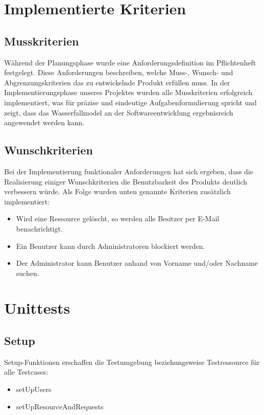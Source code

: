 \documentclass[parskip=full,11pt]{scrartcl}
\begin{document}
\newpage
\section{Implementierte Kriterien}
\subsection{Musskriterien}
Während der Planungsphase wurde eine Anforderungsdefinition im Pflichtenheft festgelegt. Diese Anforderungen beschreiben, welche Muss-, Wunsch- und Abgrenzungskriterien das zu entwickelnde Produkt erfüllen muss. In der Implementierungsphase unseres Projektes wurden alle Musskriterien erfolgreich implementiert, was für präzise und eindeutige Aufgabenformulierung spricht und zeigt, dass das Wasserfallmodel an der Softwareentwicklung ergebnisreich angewendet werden kann.   

\subsection{Wunschkriterien}
Bei der Implementierung funktionaler Anforderungen hat sich ergeben, dass die Realisierung einiger Wunschkriterien die Benutzbarkeit des Produkts deutlich verbessern würde. Als Folge wurden unten genannte Kriterien zusätzlich implementiert:
\begin{itemize}
\item Wird eine Ressource gelöscht, so werden alle Besitzer per E-Mail benachrichtigt.
\item Ein Benutzer kann durch Administratoren blockiert werden.
\item Der Administrator kann Benutzer anhand von Vorname und/oder Nachname suchen.
\end{itemize}


\newpage
\section*{Unittests}
\subsection*{Setup}
Setup-Funktionen erschaffen die Testumgebung beziehungsweise Testressource für alle Testcases:
\begin{itemize}
\item setUpUsers
\item setUpResourceAndRequests
\end{itemize}
\end{document}
